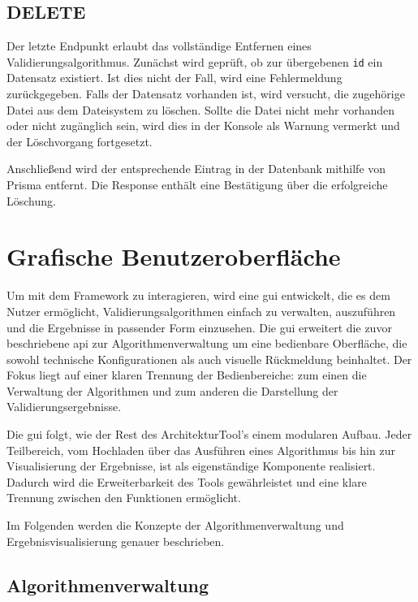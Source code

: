 \subsection{DELETE}


Der letzte Endpunkt erlaubt das vollständige Entfernen eines Validierungsalgorithmus. Zunächst wird geprüft, ob zur übergebenen \texttt{id} ein Datensatz existiert. Ist dies nicht der Fall, wird eine Fehlermeldung zurückgegeben. Falls der Datensatz vorhanden ist, wird versucht, die zugehörige Datei aus dem Dateisystem zu löschen. Sollte die Datei nicht mehr vorhanden oder nicht zugänglich sein, wird dies in der Konsole als Warnung vermerkt und der Löschvorgang fortgesetzt.

Anschließend wird der entsprechende Eintrag in der Datenbank mithilfe von Prisma entfernt. Die Response enthält eine Bestätigung über die erfolgreiche Löschung.

\section{Grafische Benutzeroberfläche}
\label{sec:gui}


Um mit dem Framework zu interagieren, wird eine \gls{gui} entwickelt, die es dem Nutzer ermöglicht, Validierungsalgorithmen einfach zu verwalten, auszuführen und die Ergebnisse in passender Form einzusehen. Die \gls{gui} erweitert die zuvor beschriebene \gls{api} zur Algorithmenverwaltung um eine bedienbare Oberfläche, die sowohl technische Konfigurationen als auch visuelle Rückmeldung beinhaltet. Der Fokus liegt auf einer klaren Trennung der Bedienbereiche: zum einen die Verwaltung der Algorithmen und zum anderen die Darstellung der Validierungsergebnisse.

Die \gls{gui} folgt, wie der Rest des ArchitekturTool's einem modularen Aufbau. Jeder Teilbereich, vom Hochladen über das Ausführen eines Algorithmus bis hin zur Visualisierung der Ergebnisse, ist als eigenständige Komponente realisiert. Dadurch wird die Erweiterbarkeit des Tools gewährleistet und eine klare Trennung zwischen den Funktionen ermöglicht.

Im Folgenden werden die Konzepte der Algorithmenverwaltung und Ergebnisvisualisierung genauer beschrieben.

\subsection{Algorithmenverwaltung}
\label{subsec:gui_verwaltung}

